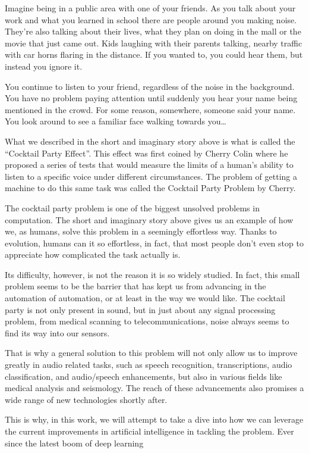 \documentclass{book}
\begin{document}
\qquad Imagine being in a public area with one of your friends. As you talk about your work and what you learned in school there are people around you making noise. They’re also talking about their lives, what they plan on doing in the mall or the movie that just came out. Kids laughing with their parents talking, nearby traffic with car horns flaring in the distance. If you wanted to, you could hear them, but instead you ignore it.
\par
You continue to listen to your friend, regardless of the noise in the background. You have no problem paying attention until suddenly you hear your name being mentioned in the crowd. For some reason, somewhere, someone said your name. You look around to see a familiar face walking towards you…
\par
What we described in the short and imaginary story above is what is called the “Cocktail Party Effect”. This effect was first coined by Cherry Colin\cite{Cherry} where he proposed a series of tests that would measure the limits of a human’s ability to listen to a specific voice under different circumstances. The problem of getting a machine to do this same task was called the Cocktail Party Problem by Cherry.
\par
The cocktail party problem is one of the biggest unsolved problems in computation. The short and imaginary story above gives us an example of how we, as humans, solve this problem in a seemingly effortless way. Thanks to evolution, humans can it so effortless, in fact, that most people don’t even stop to appreciate how complicated the task actually is.
\par
Its difficulty, however, is not the reason it is so widely studied. In fact, this small problem seems to be the barrier that has kept us from advancing in the automation of automation, or at least in the way we would like. The cocktail party is not only present in sound, but in just about any signal processing problem, from medical scanning to telecommunications\cite{CocktailPartyProblemRevisit}, noise always seems to find its way into our sensors.
\par
That is why a general solution to this problem will not only allow us to improve greatly in audio related tasks, such as speech recognition, transcriptions, audio classification, and audio/speech enhancements, but also in various fields like medical analysis and seismology. The reach of these advancements also promises a wide range of new technologies shortly after.
\par
This is why, in this work, we will attempt to take a dive into how we can leverage the current improvements in artificial intelligence in tackling the problem. Ever since the latest boom of deep learning \cite{DeepLearning}
\end{document}
